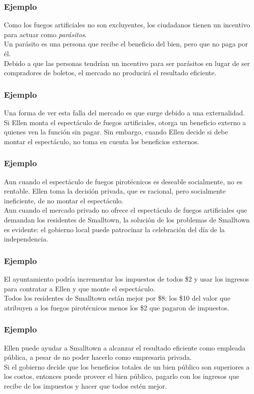 \documentclass{beamer}
\begin{document}
\begin{frame}
\frametitle{Ejemplo}
Como los fuegos artificiales no son excluyentes, los ciudadanos tienen un incentivo para actuar como \textit{parásitos}.\\
\vspace{3mm}
Un parásito es una persona que recibe el beneficio del bien, pero que no paga por él.\\
\vspace{3mm}
Debido a que las personas tendrían un incentivo para ser parásitos en lugar de ser compradores de boletos, el mercado no producirá el resultado eficiente.
\end{frame}

\begin{frame}
\frametitle{Ejemplo}
Una forma de ver esta falla del mercado es que surge debido a una externalidad.\\
\vspace{3mm}
Si Ellen monta el espectáculo de fuegos artificiales, otorga un beneficio externo a quienes ven la función sin pagar. Sin embargo, cuando Ellen decide si debe montar el espectáculo, no toma en cuenta los beneficios externos.
\end{frame}

\begin{frame}
\frametitle{Ejemplo}
Aun cuando el espectáculo de fuegos pirotécnicos es deseable socialmente, no es rentable. Ellen toma la decisión privada, que es racional, pero socialmente ineficiente, de no montar el espectáculo.\\
\vspace{3mm}
Aun cuando el mercado privado no ofrece el espectáculo de fuegos artificiales que demandan los residentes de Smalltown, la solución de los problemas de Smalltown es evidente: el gobierno local puede patrocinar la celebración del día de la independencia.
\end{frame}

\begin{frame}
\frametitle{Ejemplo}
El ayuntamiento podría incrementar los impuestos de todos \$2 y usar los ingresos para contratar a Ellen y que monte el espectáculo. \\
\vspace{3mm}
Todos los residentes de Smalltown están mejor por \$8: los \$10 del valor que atribuyen a los fuegos pirotécnicos
menos los \$2 que pagaron de impuestos.
\end{frame}

\begin{frame}
\frametitle{Ejemplo}
Ellen puede ayudar a Smalltown a alcanzar el resultado eficiente como empleada pública, a pesar de no poder hacerlo como empresaria privada.\\
\vspace{3mm}
Si el gobierno decide que los beneficios totales de un bien público son superiores a los costos, entonces puede proveer el bien público, pagarlo con los ingresos que recibe de los impuestos y hacer que todos estén mejor.
\end{frame}
\end{document}
